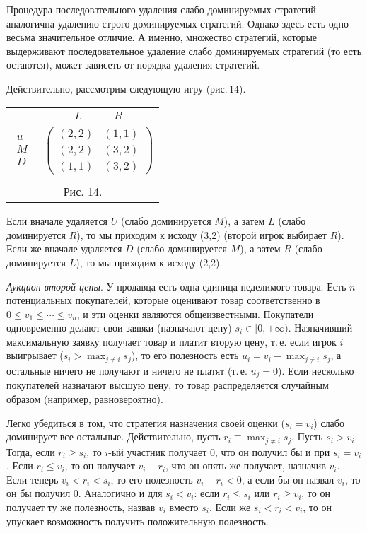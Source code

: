\documentclass[12pt]{article}
\begin{document}
Процедура последовательного удаления слабо доминируемых стратегий
аналогична удалению строго доминируемых стратегий. Однако здесь есть
одно весьма значительное отличие. А именно, множество стратегий,
которые выдерживают последовательное удаление слабо доминируемых
стратегий (то есть остаются), может зависеть от порядка удаления
стратегий.

Действительно, рассмотрим следующую игру (рис.\,14).

\begin{center}
\begin{tabular}{cc}
&$\begin{array}{cc} L\quad &\quad R \end{array}$\\
$\begin{array}{c} u\\ M\\ D\end{array}$& $\left(\begin{array}{cc}
(2,2)&(1,1)\\
(2,2)&(3,2)\\
(1,1)&(3,2) \end{array}\right)$\\
\multicolumn{2}{c}{}\\
\multicolumn{2}{c}{Рис. 14.}\\
\end{tabular}
\end{center}

Если вначале удаляется $U$ (слабо доминируется $M$), а затем $L$
(слабо доминируется $R$), то мы приходим к исходу (3,2) (второй
игрок выбирает $R$). Если же вначале удаляется $D$ (слабо
доминируется $M$), а затем  $R$ (слабо доминируется $L$), то мы
приходим к исходу (2,2).



{\it Аукцион второй цены}. У продавца есть одна единица неделимого
товара. Есть $n$ потенциальных покупателей, которые оценивают
товар соответственно в $0\le v_1\le\cdots\le v_n$, и эти оценки
являются общеизвестными.  Покупатели одновременно делают свои
заявки (назначают цену) $s_i\in[0,+\infty)$. Назначивший
максимальную заявку получает товар и платит вторую цену, т.\,е.
если игрок $i$ выигрывает ($s_i>\max_{j\ne i}s_j$), то его
полезность есть $u_i=v_i-\max_{j\ne i}s_j$, а остальные ничего не
получают и ничего не платят (т.\,е. $u_j=0$). Если несколько
покупателей назначают высшую цену, то товар
 распределяется случайным образом (например, равновероятно).

Легко убедиться в том, что стратегия назначения своей оценки
($s_i=v_i$) слабо доминирует все остальные. Действительно, пусть
$r_i\equiv\max_{j\ne i}s_j$.  Пусть $s_i>v_i$. Тогда, если $r_i\ge
s_i$, то $i$-ый участник получает 0, что он получил бы и при
$s_i=v_i$. Если $r_i\le v_i$, то он получает $v_i-r_i$, что он опять
же получает, назначив $v_i$. Если теперь $v_i<r_i<s_i$, то его
полезность  $v_i-r_i<0$, а если бы он назвал $v_i$, то он бы получил
0. Аналогично и для $s_i<v_i$: если $r_i\le s_i$  или $r_i\ge v_i$,
то он получает ту же полезность, назвав $v_i$ вместо $s_i$. Если же
$s_i<r_i<v_i$, то он упускает возможность получить положительную
полезность.
\end{document}

